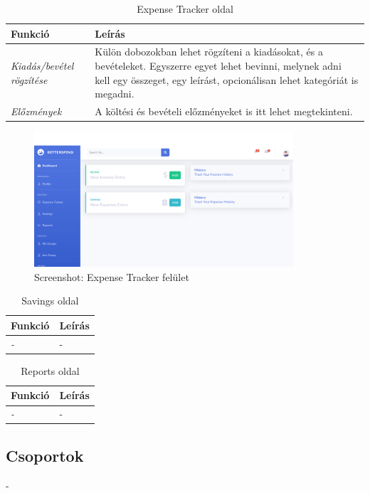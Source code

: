 \begin{table}[H]
	\centering
	\begin{tabular}{ | m{} | m{} | }
		\hline
		\textbf{Funkció} & \textbf{Leírás} \\
		\hline \hline
		\emph{Kiadás/bevétel rögzítése} & Külön dobozokban lehet rögzíteni a kiadásokat, és a bevételeket. Egyszerre egyet lehet bevinni, melynek adni kell egy összeget, egy leírást, opcionálisan lehet kategóriát is megadni. \\
		\hline
		\emph{Előzmények} &  A költési és bevételi előzményeket is itt lehet megtekinteni.  \\
		\hline
	\end{tabular}
	\caption{Expense Tracker oldal}
	\label{tab:expense-tracker}
\end{table}

\begin{figure}[H]
	\centering
	\includegraphics[height=190px]{img/expense-tracker-screenshot}
	\caption{Screenshot: Expense Tracker felület}
	\label{fig:expense-tracker}
\end{figure}

\begin{table}[H]
	\centering
	\begin{tabular}{ | m{} | m{} | }
		\hline
		\textbf{Funkció} & \textbf{Leírás} \\
		\hline \hline
		\emph{-} & - \\
		\hline
	\end{tabular}
	\caption{Savings oldal}
	\label{tab:savings}
\end{table}

\begin{table}[H]
	\centering
	\begin{tabular}{ | m{} | m{} | }
		\hline
		\textbf{Funkció} & \textbf{Leírás} \\
		\hline \hline
		\emph{-} & - \\
		\hline
	\end{tabular}
	\caption{Reports oldal}
	\label{tab:reports}
\end{table}

\subsection{Csoportok}
-